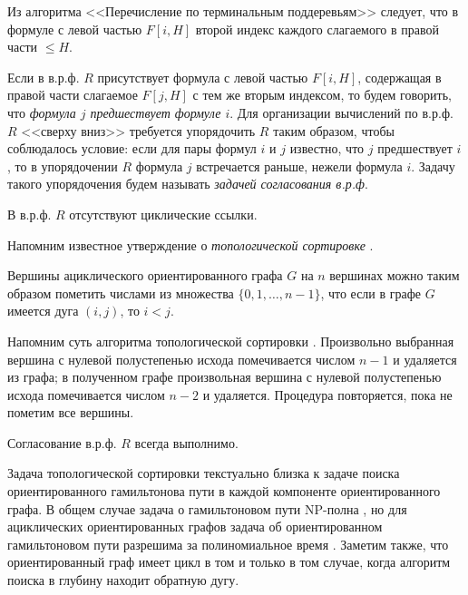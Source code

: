 Из алгоритма <<Перечисление по терминальным поддеревьям>> следует, что в формуле с левой частью $F[i,H]$ второй индекс каждого слагаемого в правой части  $\leq H$.

Если в в.р.ф. $R$ присутствует формула с левой частью $F[i,H]$, содержащая в правой части слагаемое $F[j,H]$ с тем же вторым индексом, то будем говорить, что \textit{ формула $j$ предшествует формуле $i$}. Для организации вычислений по в.р.ф. $R$ <<сверху вниз>> требуется упорядочить $R$ таким образом, чтобы соблюдалось условие: если для пары формул $i$ и $j$ известно, что $j$ предшествует $i$, то в упорядочении $R$ формула $j$ встречается раньше, нежели формула $i$. Задачу такого упорядочения будем называть \textit{ задачей согласования в.р.ф}.

\begin{statement} \label{akm1the6}
В в.р.ф. $R$ отсутствуют циклические ссылки.
\end{statement}

Напомним известное утверждение о \textit{ топологической сортировке}
\cite{akm_13}.

\begin{statement} \label{akm1the7}
Вершины ациклического ориентированного графа $G$ на $n$ вершинах можно таким образом пометить числами из множества $\{0, 1, \dots, n-1\}$, что если в графе $G$ имеется дуга $(i,j)$, то $i<j$.
\end{statement}


Напомним суть алгоритма топологической сортировки \cite{akm_13}. Произвольно выбранная вершина с нулевой полустепенью исхода помечивается числом $n-1$ и удаляется из графа; в полученном графе произвольная вершина с нулевой полустепенью исхода помечивается числом $n-2$ и удаляется. Процедура повторяется, пока не пометим все вершины.

\begin{statement} \label{akm1the8}
Согласование в.р.ф. $R$ всегда выполнимо.
\end{statement}

\begin{remark} Задача топологической сортировки текстуально близка к задаче поиска ориентированного гамильтонова пути в каждой компоненте ориентированного графа. В общем случае задача о гамильтоновом пути NP-полна \cite{akm_14}, но для ациклических ориентированных графов задача об ориентированном гамильтоновом пути разрешима за полиномиальное время
\cite{akm_15}. Заметим также, что ориентированный граф имеет цикл в том и только в том случае, когда алгоритм поиска в глубину \cite{akm_16} находит обратную дугу.
\end{remark}


